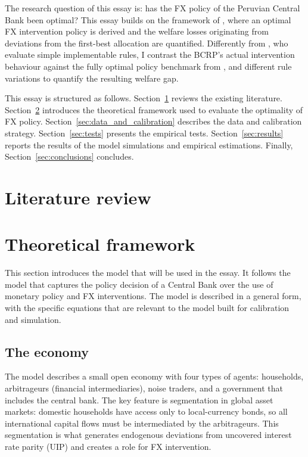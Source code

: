 \documentclass[12pt,a4paper]{article}
\begin{document}
The research question of this essay is: has the FX policy of the Peruvian Central Bank been optimal? This essay builds on the framework of \cite{itskhokimukhin2025}, where an optimal FX intervention policy is derived and the welfare losses originating from deviations from the first-best allocation are quantified. Differently from \cite{MONTORO2023102825}, who evaluate simple implementable rules, I contrast the BCRP's actual intervention behaviour against the fully optimal policy benchmark from \cite{itskhokimukhin2025}, and different rule variations to quantify the resulting welfare gap.

This essay is structured as follows. Section~\ref{sec:literature_review} reviews the existing literature. Section~\ref{sec:theoretical_framework} introduces the theoretical framework used to evaluate the optimality of FX policy. Section~\ref{sec:data_and_calibration} describes the data and calibration strategy. Section~\ref{sec:tests} presents the empirical tests. Section~\ref{sec:results} reports the results of the model simulations and empirical estimations. Finally, Section~\ref{sec:conclusions} concludes.

\section{Literature review}
\label{sec:literature_review}



\section{Theoretical framework}
\label{sec:theoretical_framework}

This section introduces the model that will be used in the essay. It follows the \cite{itskhokimukhin2025} model that captures the policy decision of a Central Bank over the use of monetary policy and FX interventions. The model is described in a general form, with the specific equations that are relevant to the model built for calibration and simulation.

\subsection{The economy}

The model describes a small open economy with four types of agents: households, arbitrageurs (financial intermediaries), noise traders, and a government that includes the central bank. The key feature is segmentation in global asset markets: domestic households have access only to local-currency bonds, so all international capital flows must be intermediated by the arbitrageurs. This segmentation is what generates endogenous deviations from uncovered interest rate parity (UIP) and creates a role for FX intervention. 
\end{document}
